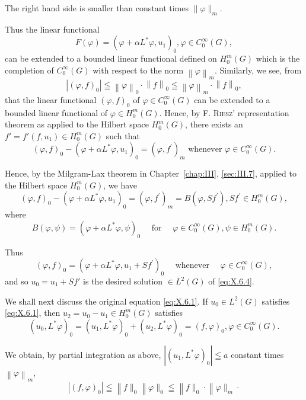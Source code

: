 The right hand side is smaller than constant times $\|\varphi\|_m$. 

Thus the linear functional 
\[
F (\varphi) = \left(\varphi + \alpha L ^{*} \varphi , u _{1}\right) _{0}, \varphi \in C _{0} ^{\infty} (G),
\]
can be extended to a bounded linear functional defined on $H_{0}^{m}(G)$ which is the completion of $C_{0}^{\infty}(G)$ with respect to the norm $\left\|\varphi\right\|_{m}$. Similarly, we see, from 
\[
\left| (\varphi , f) _{0} \right| \leqq \left\| \varphi \right\| _{0} \cdot \left\| f \right\| _{0} \leqq \left\| \varphi \right\| _{m} \cdot \left\| f \right\| _{0},
\]
that the linear functional $(\varphi, f)_0$ of $\varphi \in C_0^\infty(G)$ can be extended to a bounded linear functional of $\varphi \in H_0^m(G)$. Hence, by F. \textsc{Riesz}' representation theorem as applied to the Hilbert space $H_0^m(G)$, there exists an $f' = f'(f, u_1) \in H_0^m(G)$ such that 
\[
(\varphi , f) _{0} - (\varphi + \alpha L ^{*} \varphi , u _{1}) _{0} = (\varphi , f ^{\prime}) _{m} \text{ whenever } \varphi \in C _{0} ^{\infty} (G).
\]

Hence, by the Milgram-Lax theorem in Chapter~\ref{chap:III}, \ref{sec:III.7}, applied to the Hilbert space $H_0^m(G)$, we have 
\begin{equation}\label{eq:X.6.7}
(\varphi , f) _{0} - (\varphi + \alpha L ^{*} \varphi , u _{1}) _{0} = (\varphi , f ^{\prime}) _{m} = B (\varphi , S f ^{\prime}), S f ^{\prime} \in H _{0} ^{m} (G),
\end{equation}
where 
\begin{equation}\label{eq:X.6.8}
B (\varphi , \psi) = (\varphi + \alpha L ^{*} \varphi , \psi) _{0} \quad \text{ for } \quad \varphi \in C _{0} ^{\infty} (G), \psi \in H _{0} ^{m} (G).
\end{equation}

Thus 
\[
(\varphi , f) _{0} = (\varphi + \alpha L ^{*} \varphi , u _{1} + S f ^{\prime}) _{0} \quad \text{ whenever } \quad \varphi \in C _{0} ^{\infty} (G),
\]
and so $u_0 = u_1 + Sf'$ is the desired solution $\in L^2(G)$ of \eqref{eq:X.6.4}. 

We shall next discuss the original equation \eqref{eq:X.6.1}. If $u_0 \in L^2(G)$ satisfies \eqref{eq:X.6.1}, then $u_2 = u_0 - u_1 \in H_0^m(G)$ satisfies 
\[
(u _{0}, L ^{*} \varphi) _{0} = (u _{1}, L ^{*} \varphi) _{0} + (u _{2}, L ^{*} \varphi) _{0} = (f, \varphi) _{0}, \varphi \in C _{0} ^{\infty} (G).
\]

We obtain, by partial integration as above, 
$\left|(u_1, L^*\varphi)_0\right| \leqq a$ constant times $\left\|\varphi\right\|_m$, 
\[
\left| (f, \varphi) _{0} \right| \leqq \left\| f \| _{0} \right. \left\| \varphi \| _{0} \right. \leqq \left\| f \| _{0} \cdot \right. \left\| \varphi \| _{m} \cdot \right.
\]

